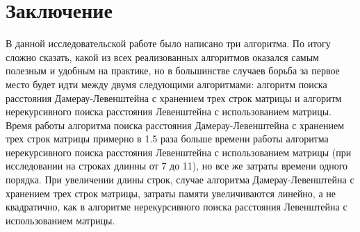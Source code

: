 \documentclass[12pt, a4paper]{article}
\begin{document}
\section{Заключение}
В данной исследовательской работе было написано три алгоритма. 
По итогу сложно сказать, какой из всех реализованных 
алгоритмов оказался самым полезным и удобным на практике, но в
большинстве случаев борьба за первое место будет идти между 
двумя следующими алгоритмами: алгоритм поиска расстояния
Дамерау-Левенштейна с хранением трех строк матрицы и
алгоритм нерекурсивного поиска расстояния Левенштейна с
использованием матрицы. Время работы алгоритма поиска
расстояния Дамерау-Левенштейна с хранением трех строк
матрицы примерно в 1.5
раза больше времени работы алгоритма нерекурсивного поиска
расстояния Левенштейна с использованием матрицы (при
исследовании на строках длинны от 7 до 11), но все же
затраты времени одного порядка. При увеличении длины строк,
случае алгоритма Дамерау-Левенштейна с хранением трех 
строк матрицы, затраты памяти увеличиваются линейно, а не 
квадратично, как в алгоритме нерекурсивного поиска расстояния 
Левенштейна с использованием матрицы.
\newpage
\end{document}
